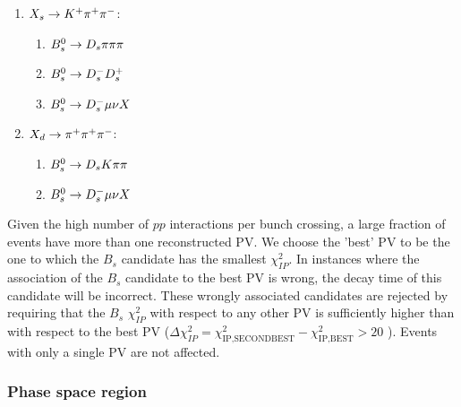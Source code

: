 


\begin{enumerate}

\item $X_s \rightarrow {\ensuremath{{K}^+}} {\ensuremath{{\pi}^+}} {\ensuremath{{\pi}^-}}$:
\begin{enumerate}
\item ${{B}^0_{s}}\rightarrow{\ensuremath{{D}_{s}}}{\ensuremath{\pi}}{\ensuremath{\pi}}{\ensuremath{\pi}}$
\item ${{B}^0_{s}}\rightarrow{\ensuremath{{D}^-_{s}}}{\ensuremath{{D}^+_{s}}}$ 
\item ${{B}^0_{s}} \rightarrow {\ensuremath{{D}^-_{s}}} \mu \nu X$
\end{enumerate}

\item $X_d \rightarrow {\ensuremath{{\pi}^+}} {\ensuremath{{\pi}^+}} {\ensuremath{{\pi}^-}}$:
\begin{enumerate}
\item ${{B}^0_{s}}\rightarrow{\ensuremath{{D}_{s}}}{\ensuremath{K}}{\ensuremath{\pi}}{\ensuremath{\pi}}$
\item ${{B}^0_{s}} \rightarrow {\ensuremath{{D}^-_{s}}} \mu \nu X$
\end{enumerate}

\end{enumerate}


Given the high number of $pp$ interactions per bunch crossing, a large fraction
of events have more than one reconstructed PV. 
We choose the 'best' PV to be the one to which the 
$B_s$ candidate has the smallest $\chi^2_{IP}$.
In instances where the association of the $B_s$ candidate to the best PV is wrong,
the decay time of this candidate will be incorrect. 
These wrongly associated candidates
are rejected by requiring that the $B_s$ $\chi^2_{IP}$ with respect to any other PV is sufficiently higher than with respect to the best PV 
($\Delta \chi^2_{IP} = \chi^2_{\text{IP,SECONDBEST}} - \chi^2_{\text{IP,BEST}} > 20$ ).
Events with only a single PV are not affected.

 \subsubsection{Phase space region}

